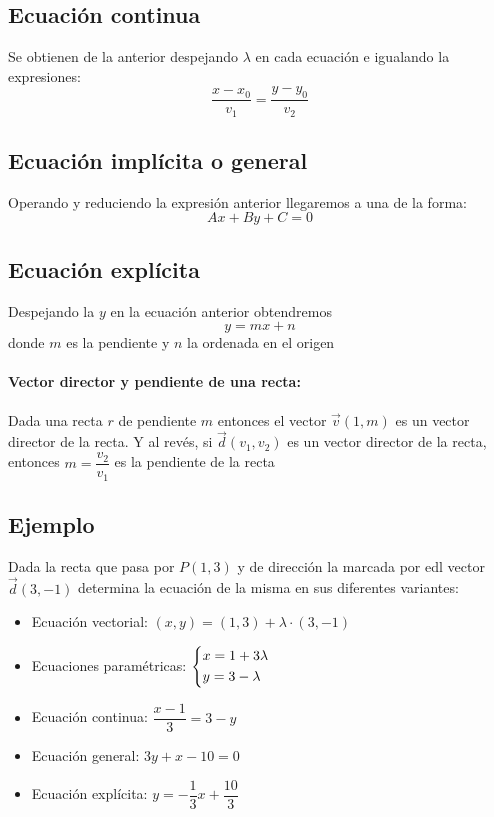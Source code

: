 \subsection{Ecuación continua}
Se obtienen de la anterior despejando $\lambda$ en cada ecuación e igualando la expresiones:
$$ \dfrac{x-x_0}{v_1}=\dfrac{y-y_0}{v_2}$$

\subsection{Ecuación implícita o general}
Operando y reduciendo la expresión anterior llegaremos a una de la forma:
$$Ax+By+C=0$$

\subsection{Ecuación explícita}
Despejando la $y$ en la ecuación anterior obtendremos
$$y=mx+n$$
donde $m$ es la pendiente y $n$ la ordenada en el origen
\paragraph*{Vector director y pendiente de una recta:} 
Dada una recta $r$ de pendiente $m$ entonces el vector $\overrightarrow{v}(1,m)$ es un vector director de la recta. Y al revés, si $\overrightarrow{d}(v_1,v_2)$ es un vector director de la recta, entonces $m=\dfrac{v_2}{v_1}$ es la pendiente de la recta 

\subsection{Ejemplo}
Dada la recta que pasa por $P(1,3)$ y de dirección la marcada por edl vector $\overrightarrow{d}(3,-1)$ determina la ecuación de la misma en sus diferentes variantes:
\begin{itemize}
\item Ecuación vectorial:
$(x,y)=(1,3)+\lambda\cdot(3,-1)$
\item Ecuaciones paramétricas:
$\left\lbrace \begin{gathered}
  x = 1 + 3\lambda \hfill \\
  y = 3 - \lambda \hfill \\ 
\end{gathered}  \right.
$
\item Ecuación continua:
$\dfrac{x-1}{3}=3-y$
\item Ecuación general:
$3y+x-10=0$
\item Ecuación explícita:
$y=-\dfrac{1}{3}x+\dfrac{10}{3}$
\end{itemize}


